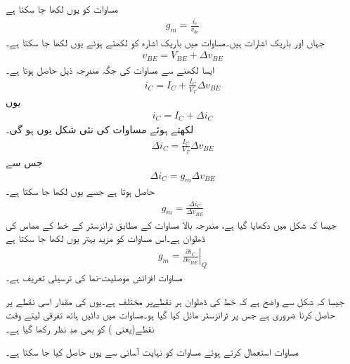 
مساوات   کو یوں لکھا جا سکتا ہے
\begin{align}
g_m = \frac{i_c}{v_{be}}
\end{align}
جہاں   اور  باریک اشارات ہیں۔مساوات   میں باریک اشارہ  کو  لکھتے ہوئے یوں لکھا جا سکتا ہے۔
\begin{align}
v_{BE}=V_{BE}+\Delta v_{BE}
\end{align}
ایسا لکھنے سے مساوات   کی جگہ مندرجہ ذیل حاصل ہوتا ہے۔
\begin{align}
i_C=I_C+\frac{I_C}{V_T} \Delta v_{BE}
\end{align}
یوں
\begin{align}
i_C=I_C+\Delta i_C
\end{align}
لکھتے ہوئے مساوات   کی نئی شکل یوں ہو گی۔
\begin{align}
\Delta i_C =\frac{I_C}{V_T} \Delta v_{BE}
\end{align}
جس سے
\begin{align}
\Delta i_C = g_m \Delta v_{BE}
\end{align}
حاصل ہوتا ہے جسے یوں لکھا جا سکتا ہے۔
\begin{align}
g_m = \frac{\Delta i_C}{\Delta v_{BE}}
\end{align}
جیسا کہ شکل    میں دکھایا گیا ہے، مندرجہ بالا مساوات کے مطابق  ٹرانزسٹر کے  خط کے مماس کی ڈھلوان ہے۔اس مساوات کو مزید بہتر یوں لکھا جا سکتا ہے
\begin{align} \label{مساوات_ٹرانزسٹر_موصلیت_نما_کی_ترسیلی_تعریف}
g_m =\left . \frac{\partial i_C}{\partial v_{BE}} \right |_Q
\end{align}
مساوات   افزائش موصلیت-نما   کی ترسیلی تعریف ہے۔

جیسا کہ شکل    سے واضح ہے کہ  خط کی ڈھلوان ہر نقطےپر مختلف ہے۔یوں  کی مقدار اسی نقطے پر حاصل کرنا ضروری ہے جس پر ٹرانزسٹر مائل کیا گیا ہو۔مساوات   میں دائیں ہاتھ تفرقی لیتے وقت نقطے(یعنی ) کو بھی مدِ نظر رکھا گیا ہے۔

مساوات   استعمال کرتے ہوئے مساوات   کو نہایت آسانی سے یوں حاصل کیا جا سکتا ہے۔

